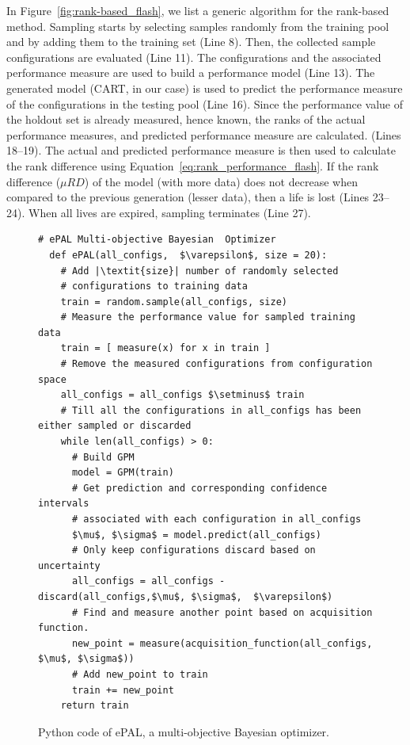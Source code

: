 In Figure~\ref{fig:rank-based_flash}, we list a generic algorithm for the rank-based method. Sampling starts by selecting samples randomly from the training pool and by adding them to the training set (Line 8). Then, the collected sample configurations are evaluated (Line 11). The configurations and the associated performance measure are used to build a performance model (Line 13). The generated model (CART, in our case) is used to predict the performance measure of the configurations in the testing pool (Line 16). Since the performance value of the holdout set is already measured, hence known, the ranks of the actual performance measures, and predicted performance measure are calculated. (Lines 18--19). The actual and predicted performance measure is then used to calculate the rank difference using Equation~\ref{eq:rank_performance_flash}. If the rank difference ($\mu RD$) of the model (with more data) does not decrease when compared to the previous generation (lesser data), then a life is lost (Lines 23--24). When all lives are expired, sampling terminates (Line 27).
\begin{figure}[!t]
\hspace{0.4cm}\begin{lstlisting}[xrightmargin=5.0ex,mathescape,frame=none,numbers=right]
  # ePAL Multi-objective Bayesian  Optimizer
  def ePAL(all_configs,  $\varepsilon$, size = 20):  
    # Add |\textit{size}| number of randomly selected 
    # configurations to training data
    train = random.sample(all_configs, size)
    # Measure the performance value for sampled training data
    train = [ measure(x) for x in train ]
    # Remove the measured configurations from configuration space
    all_configs = all_configs $\setminus$ train  
    # Till all the configurations in all_configs has been either sampled or discarded 
    while len(all_configs) > 0:
      # Build GPM
      model = GPM(train)
      # Get prediction and corresponding confidence intervals
      # associated with each configuration in all_configs
      $\mu$, $\sigma$ = model.predict(all_configs)
      # Only keep configurations discard based on uncertainty 
      all_configs = all_configs - discard(all_configs,$\mu$, $\sigma$,  $\varepsilon$)
      # Find and measure another point based on acquisition function.
      new_point = measure(acquisition_function(all_configs, $\mu$, $\sigma$))
      # Add new_point to train 
      train += new_point
    return train 
\end{lstlisting}
\caption{\small{Python code of ePAL, a multi-objective Bayesian optimizer.}}
\label{fig:ePAL}  
\end{figure}

